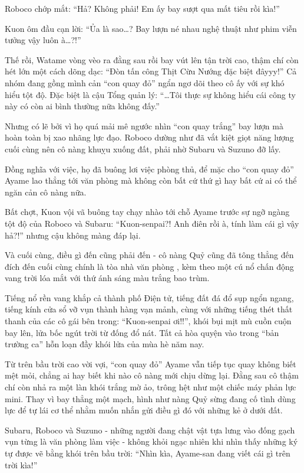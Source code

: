 \documentclass[../main.tex]{subfiles}
\begin{document}
Roboco chớp mắt: ``Hả? Không phải! Em ấy bay sượt qua mất tiêu rồi kìa!''

Kuon ôm đầu cạn lời: ``Ủa là sao\dots? Bay lượn né nhau nghệ thuật như phim viễn tưởng vậy luôn à\dots?!''

Thế rồi, Watame vòng vèo ra đằng sau rồi bay vút lên tận trời cao, thậm chí còn hét lớn một cách dõng dạc: ``Đòn tấn công Thịt Cừu Nướng đặc biệt đâyyy!'' Cả nhóm đang gồng mình cản ``con quay đỏ'' ngẩn ngơ dõi theo cô ấy với sự khó hiểu tột độ. Đặc biệt là cậu Tổng quản lý: ``\dots Tôi thực sự không hiểu cái công ty này có còn ai bình thường nữa không đấy.''

Nhưng có lẽ bởi vì họ quá mải mê ngước nhìn ``con quay trắng'' bay lượn mà hoàn toàn bị xao nhãng lực đạo. Roboco dường như đã vắt kiệt giọt năng lượng cuối cùng nên cô nàng khuỵu xuống đất, phải nhờ Subaru và Suzuno đỡ lấy.

Đồng nghĩa với việc, họ đã buông lơi việc phòng thủ, để mặc cho ``con quay đỏ'' Ayame lao thẳng tới văn phòng mà không còn bất cứ thứ gì hay bất cứ ai có thể ngăn cản cô nàng nữa.

Bất chợt, Kuon vội vã buông tay chạy nhào tới chỗ Ayame trước sự ngỡ ngàng tột độ của Roboco và Subaru: ``Kuon-senpai?! Anh điên rồi à, tính làm cái gì vậy hả?!'' nhưng cậu không màng đáp lại.

Và cuối cùng, điều gì đến cũng phải đến - cô nàng Quỷ cũng đã tông thẳng đến đích đến cuối cùng chính là tòa nhà văn phòng \hll, kèm theo một cú nổ chấn động vang trời lóa mắt với thứ ánh sáng màu trắng bao trùm.


Tiếng nổ rền vang khắp cả thành phố Điện tử, tiếng đất đá đổ sụp ngổn ngang, tiếng kính cửa sổ vỡ vụn thành hàng vạn mảnh, cùng với những tiếng thét thất thanh của các cô gái bên trong: ``Kuon-senpai ơi!!'', khói bụi mịt mù cuồn cuộn bay lên, lửa bốc ngút trời từ đống đổ nát. Tất cả hòa quyện vào trong ``bản trường ca'' hỗn loạn đầy khói lửa của mùa hè năm nay.

\ct

Từ trên bầu trời cao vời vợi, ``con quay đỏ'' Ayame vẫn tiếp tục quay không biết mệt mỏi, chẳng ai hay biết khi nào cô nàng mới chịu dừng lại. Đằng sau cô thậm chí còn nhả ra một làn khói trắng mờ ảo, trông hệt như một chiếc máy phản lực mini. Thay vì bay thẳng một mạch, hình như nàng Quỷ sừng đang cố tình dùng lực để tự lái cơ thể nhằm muốn nhắn gửi điều gì đó với những kẻ ở dưới đất.

Subaru, Roboco và Suzuno - những người đang chật vật tựa lưng vào đống gạch vụn từng là văn phòng làm việc - không khỏi ngạc nhiên khi nhìn thấy những ký tự được vẽ bằng khói trên bầu trời: ``Nhìn kìa, Ayame-san đang viết cái gì trên trời kìa!''
\end{document}
